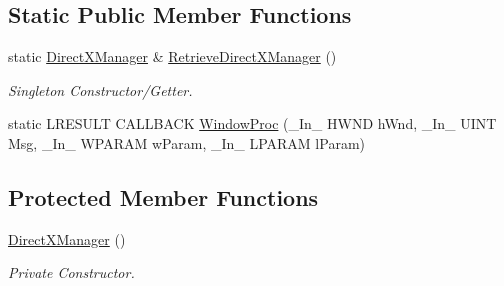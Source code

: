 \subsection*{Static Public Member Functions}
\begin{DoxyCompactItemize}
\item 
static \hyperlink{class_direct_x_manager}{Direct\+X\+Manager} \& \hyperlink{class_direct_x_manager_ac785f35f30dd23faa97ec028ff2a4c91}{Retrieve\+Direct\+X\+Manager} ()
\begin{DoxyCompactList}\small\item\em Singleton Constructor/\+Getter. \end{DoxyCompactList}\item 
static L\+R\+E\+S\+U\+LT C\+A\+L\+L\+B\+A\+CK \hyperlink{class_direct_x_manager_ada0e4673d0eb74936a25c1870161e56b}{Window\+Proc} (\+\_\+\+In\+\_\+ H\+W\+ND h\+Wnd, \+\_\+\+In\+\_\+ U\+I\+NT Msg, \+\_\+\+In\+\_\+ W\+P\+A\+R\+AM w\+Param, \+\_\+\+In\+\_\+ L\+P\+A\+R\+AM l\+Param)
\end{DoxyCompactItemize}
\subsection*{Protected Member Functions}
\begin{DoxyCompactItemize}
\item 
\hyperlink{class_direct_x_manager_a1544b12672e275067e71230c93440261}{Direct\+X\+Manager} ()
\begin{DoxyCompactList}\small\item\em Private Constructor. \end{DoxyCompactList}\end{DoxyCompactItemize}
